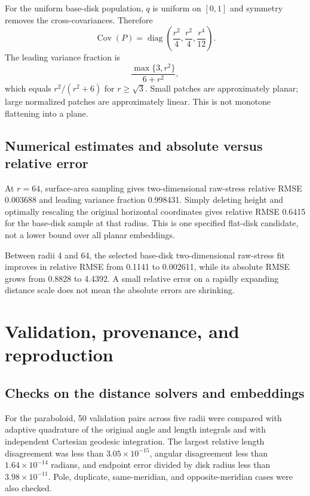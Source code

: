 \documentclass[11pt]{article}
\theoremstyle{remark}\newtheorem{remark}[proposition]{Remark}
\newcommand{\diag}{\operatorname{diag}}
\newcommand{\Cov}{\operatorname{Cov}}
\begin{document}
For the uniform base-disk population, $q$ is uniform on $[0,1]$ and symmetry
removes the cross-covariances. Therefore
\begin{equation}
 \Cov(P)=\diag\!\left(\frac{r^2}4,\frac{r^2}4,\frac{r^4}{12}\right).
\end{equation}
The leading variance fraction is
\begin{equation}
 \frac{\max\{3,r^2\}}{6+r^2},
\end{equation}
which equals $r^2/(r^2+6)$ for $r\ge\sqrt3$. Small patches are approximately
planar; large normalized patches are approximately linear. This is not
monotone flattening into a plane.

\subsection{Numerical estimates and absolute versus relative error}

At $r=64$, surface-area sampling gives two-dimensional raw-stress relative
RMSE 0.003688 and leading variance fraction 0.998431. Simply deleting height
and optimally rescaling the original horizontal coordinates gives relative
RMSE 0.6415 for the base-disk sample at that radius. This is one specified
flat-disk candidate, not a lower bound over all planar embeddings.

Between radii 4 and 64, the selected base-disk two-dimensional raw-stress fit
improves in relative RMSE from 0.1141 to 0.002611, while its absolute RMSE grows
from 0.8828 to 4.4392. A small relative error on a rapidly expanding distance
scale does not mean the absolute errors are shrinking.

\section{Validation, provenance, and reproduction}\label{app:reproduction}

\subsection{Checks on the distance solvers and embeddings}
For the paraboloid, 50 validation pairs across five radii were compared with
adaptive quadrature of the original angle and length integrals and with
independent Cartesian geodesic integration. The largest relative length
disagreement was less than $3.05\times10^{-15}$, angular disagreement less
than $1.64\times10^{-14}$ radians, and endpoint error divided by disk radius
less than $3.98\times10^{-11}$. Pole, duplicate, same-meridian, and
opposite-meridian cases were also checked.
\end{document}
